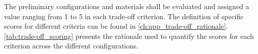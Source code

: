 The preliminary configurations and materials shall be evaluated and assigned a value ranging from 1 to 5 in each trade-off criterion. The definition of specific scores for different criteria can be found in \autoref{ch:app_trade-off_rationale}. \autoref{tab:trade-off_scoring} presents the rationale used to quantify the scores for each criterion across the different configurations.

